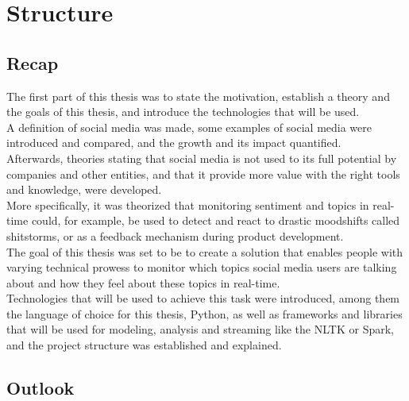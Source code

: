 
\chapter{Structure}
\label{ch:structure}

\section{Recap}
\label{sec:recap}

The first part of this thesis was to state the motivation,
establish a theory and the goals of this thesis, and introduce the technologies that will be used.
\\
A definition of social media was made,
some examples of social media were introduced and compared,
and the growth and its impact quantified.
\\
Afterwards, theories stating that social media is not used to its full potential by companies and other entities,
and that it provide more value with the right tools and knowledge, were developed. \\
More specifically, it was theorized that monitoring sentiment and topics in real-time could, for example,
be used to detect and react to drastic moodshifts called shitstorms, or as a feedback mechanism during product development.
\\
The goal of this thesis was set to be to create a solution that enables people with varying technical prowess to monitor
which topics social media users are talking about and how they feel about these topics in real-time.
\\
Technologies that will be used to achieve this task were introduced, among them the language of choice for this thesis,
Python, as well as frameworks and libraries that will be used for modeling, analysis and streaming like the NLTK or Spark,
and the project structure was established and explained.

\section{Outlook}
\label{sec:outlook}

